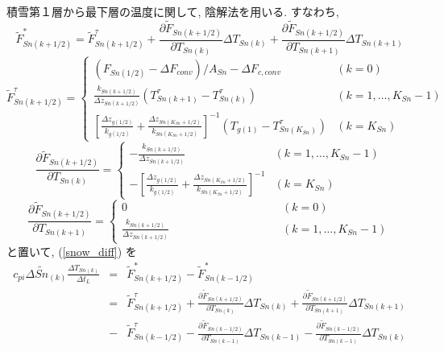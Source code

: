 積雪第１層から最下層の温度に関して, 陰解法を用いる.
すなわち,
\begin{equation}
 \widetilde{F}_{Sn(k+1/2)}^* = \widetilde{F}_{Sn(k+1/2)}^{\tau}
+\frac{\partial \widetilde{F}_{Sn(k+1/2)}}{\partial T_{Sn(k)}}
 \Delta T_{Sn(k)}
+\frac{\partial \widetilde{F}_{Sn(k+1/2)}}{\partial T_{Sn(k+1)}}
 \Delta T_{Sn(k+1)}
\end{equation}
\begin{equation}
 \widetilde{F}_{Sn(k+1/2)}^{\tau} =
\left\{
\begin{array}{ll}
( F_{Sn(1/2)} - \Delta F_{conv})/A_{Sn} - \Delta F_{c,conv}
& (k=0)\\
\displaystyle{
\frac{k_{Sn(k+1/2)}}{\Delta z_{Sn(k+1/2)}} (T_{Sn(k+1)}^{\tau} - T_{Sn(k)}^{\tau})
}
& (k=1,\ldots,K_{Sn}-1) \\
\displaystyle{
\left[\frac{\Delta z_{g(1/2)}}{k_{g(1/2)}}
+\frac{\Delta z_{Sn(K_{Sn}+1/2)}}{k_{Sn(K_{Sn}+1/2)}}
\right]^{-1}
(T_{g(1)} - T_{Sn(K_{Sn})}^{\tau})
}
& (k=K_{Sn})
\end{array}
\right.
\end{equation}
\begin{equation}
 \frac{\partial \widetilde{F}_{Sn(k+1/2)}}{\partial T_{Sn(k)}} =
\left\{
\begin{array}{ll}
\displaystyle{
- \frac{k_{Sn(k+1/2)}}{\Delta z_{Sn(k+1/2)}}
}
& (k=1,\ldots,K_{Sn}-1) \\
\displaystyle{
- \left[\frac{\Delta z_{g(1/2)}}{k_{g(1/2)}}
+\frac{\Delta z_{Sn(K_{Sn}+1/2)}}{k_{Sn(K_{Sn}+1/2)}}
\right]^{-1}
}
& (k=K_{Sn})
\end{array}
\right.
\end{equation}
\begin{equation}
 \frac{\partial \widetilde{F}_{Sn(k+1/2)}}{\partial T_{Sn(k+1)}} =
\left\{
\begin{array}{ll}
0 & \ \quad \qquad \qquad \qquad \qquad (k=0) \\
\displaystyle{
\frac{k_{Sn(k+1/2)}}{\Delta z_{Sn(k+1/2)}}
}
  & \ \quad \qquad \qquad \qquad \qquad (k=1,\ldots,K_{Sn}-1)
\end{array}
\right.
\end{equation}
と置いて, (\ref{snow_diff}) を
\begin{eqnarray}
c_{pi}\Delta \widetilde{Sn}_{(k)} \frac{\Delta T_{Sn(k)}}{\Delta t_L}
&=& \widetilde{F}_{Sn(k+1/2)}^* - \widetilde{F}_{Sn(k-1/2)}^* \nonumber \\
&=& \widetilde{F}_{Sn(k+1/2)}^{\tau}
+\frac{\partial \widetilde{F}_{Sn(k+1/2)}}{\partial T_{Sn(k)}}
 \Delta T_{Sn(k)}
+\frac{\partial \widetilde{F}_{Sn(k+1/2)}}{\partial T_{Sn(k+1)}}
 \Delta T_{Sn(k+1)} \nonumber \\
&-& \widetilde{F}_{Sn(k-1/2)}^{\tau}
-\frac{\partial \widetilde{F}_{Sn(k-1/2)}}{\partial T_{Sn(k-1)}}
 \Delta T_{Sn(k-1)}
-\frac{\partial \widetilde{F}_{Sn(k-1/2)}}{\partial T_{Sn(k-1)}}
 \Delta T_{Sn(k)}
\end{eqnarray}
